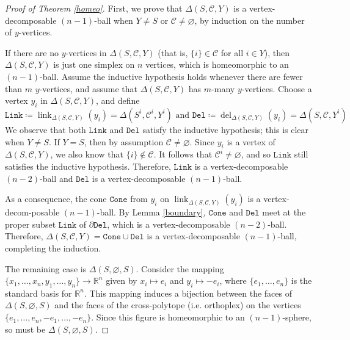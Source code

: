 \documentclass[10pt]{amsart}
\numberwithin{equation}{section}
\theoremstyle{definition}
\theoremstyle{remark}
\newcommand{\R}{\mathbb{R}}
\newcommand{\sC}{\mathscr{C}}
\newcommand{\D}{\mathtt{Del}}
\renewcommand{\emptyset}{\varnothing}
\newcommand{\dee}{\partial}
\newcommand{\Cone}{\mathtt{Cone}}
\DeclareMathOperator{\del}{\mathrm{del}}
\DeclareMathOperator{\link}{\mathrm{link}}
\newcommand{\Link}{\mathtt{Link}}
\newcommand{\1}{^{-1}}
\begin{document}

\begin{proof}[Proof of Theorem \ref{homeo}]
First, we prove that $\Delta(S,\sC,Y)$ is a vertex-decomposable $(n-1)$-ball when $Y\neq S$ or $\sC\neq \emptyset$, by induction on the number of $y$-vertices.

If there are no $y$-vertices in $\Delta(S,\sC,Y)$ (that is, $\{i\}\in \sC$ for all $i\in Y$), then $\Delta(S,\sC,Y)$ is just one simplex on $n$ vertices, which is homeomorphic to an $(n-1)$-ball. Assume the inductive hypothesis holds whenever there are fewer than $m$ $y$-vertices, and assume that $\Delta(S,\sC,Y)$ has $m$-many $y$-vertices.  Choose a vertex $y_i$ in $\Delta(S,\sC,Y)$, and define 
\[\Link \coloneqq \link_{\Delta(S,\sC,Y)}(y_i) = \Delta(S^i,\sC^i,Y^i)\text{ and } \D \coloneqq \del_{\Delta(S,\sC,Y)}(y_i) = \Delta(S,\sC,Y^i)\]
We observe that both $\Link$ and $\D$ satisfy the inductive hypothesis; this is clear when $Y\neq S$.  If $Y=S$, then by assumption $\sC\neq\emptyset$.  Since $y_i$ is a vertex of $\Delta(S,\sC,Y)$, we also know that $\{i\}\not\in \sC$.  It follows that $\sC^i\neq\emptyset$, and so $\Link$ still satisfies the inductive hypothesis.  Therefore, $\Link$ is a vertex-decomposable $(n-2)$-ball and $\D$ is a vertex-decomposable $(n-1)$-ball. 




%
%



As a consequence, the cone $\Cone$ from $y_i$ on $\link_{\Delta(S,\sC,Y)}(y_i)$ is a vertex-decom-posable $(n-1)$-ball. By Lemma \ref{boundary}, $\Cone$ and $\D$ meet at the proper subset $\Link$ of $\dee \D$, which is a vertex-decomposable $(n-2)$-ball. Therefore, $\Delta(S,\sC,Y) = \Cone \cup \D$ is a vertex-decomposable $(n-1)$-ball, completing the induction.

The remaining case is $\Delta(S,\emptyset,S)$. Consider the mapping $\{x_1,\dots,x_n,y_1,\dots,y_n\} \to \R^n$ given by $x_i \mapsto e_i$ and $y_i \mapsto -e_i$, where $\{e_1,\dots,e_n\}$ is the standard basis for $\R^n$. This mapping induces a bijection between the faces of $\Delta(S,\emptyset,S)$ and the faces of the cross-polytope (i.e. orthoplex) on the vertices $\{e_1,\dots,e_n,-e_1,\dots,-e_n\}$. Since this figure is homeomorphic to an $(n-1)$-sphere, so must be $\Delta(S,\emptyset,S)$.
\end{proof}
\end{document}

